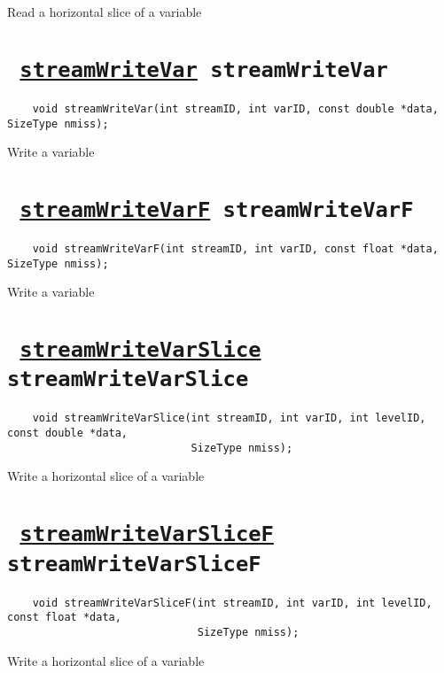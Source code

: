 Read a horizontal slice of a variable
\ifpdfoutput{}{(\ref{streamReadVarSliceF})}


\section*{\texttt{ 
\ifpdf
\hyperref[streamWriteVar]{streamWriteVar}
\else
streamWriteVar
\fi
}}
\begin{verbatim}
    void streamWriteVar(int streamID, int varID, const double *data, SizeType nmiss);
\end{verbatim}

Write a variable
\ifpdfoutput{}{(\ref{streamWriteVar})}


\section*{\texttt{ 
\ifpdf
\hyperref[streamWriteVarF]{streamWriteVarF}
\else
streamWriteVarF
\fi
}}
\begin{verbatim}
    void streamWriteVarF(int streamID, int varID, const float *data, SizeType nmiss);
\end{verbatim}

Write a variable
\ifpdfoutput{}{(\ref{streamWriteVarF})}


\section*{\texttt{ 
\ifpdf
\hyperref[streamWriteVarSlice]{streamWriteVarSlice}
\else
streamWriteVarSlice
\fi
}}
\begin{verbatim}
    void streamWriteVarSlice(int streamID, int varID, int levelID, const double *data, 
                             SizeType nmiss);
\end{verbatim}

Write a horizontal slice of a variable
\ifpdfoutput{}{(\ref{streamWriteVarSlice})}


\section*{\texttt{ 
\ifpdf
\hyperref[streamWriteVarSliceF]{streamWriteVarSliceF}
\else
streamWriteVarSliceF
\fi
}}
\begin{verbatim}
    void streamWriteVarSliceF(int streamID, int varID, int levelID, const float *data, 
                              SizeType nmiss);
\end{verbatim}

Write a horizontal slice of a variable
\ifpdfoutput{}{(\ref{streamWriteVarSliceF})}



